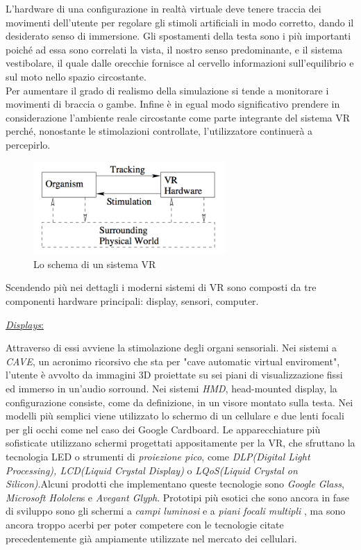 \newpage

L'hardware di una configurazione in realtà virtuale deve tenere traccia dei movimenti dell'utente per regolare gli stimoli artificiali in modo corretto, dando il desiderato senso di immersione.
Gli spostamenti della testa sono i più importanti poiché ad essa sono correlati la vista, il nostro senso predominante, e il sistema vestibolare, il quale dalle orecchie fornisce al cervello informazioni sull'equilibrio e sul moto nello spazio circostante.\cite{vestibular} \\
Per aumentare il grado di realismo della simulazione si tende a monitorare i movimenti di braccia o gambe. Infine è in egual modo significativo prendere in considerazione l'ambiente reale circostante come parte integrante del sistema VR perché, nonostante  le stimolazioni controllate, l'utilizzatore  continuerà a percepirlo.
\begin{figure}[H]
	\includegraphics[width=0.65\textwidth]{figure/TrackingStimuliBB}
	\centering
	\caption{Lo schema di un sistema VR}
\end{figure}

\newpage

Scendendo più nei dettagli i moderni sistemi di VR sono composti da tre componenti hardware principali: display, sensori, computer.
\begin{flushleft}
	\underline{\textit{Displays}:}
\end{flushleft}  Attraverso di essi avviene la stimolazione degli organi sensoriali. Nei sistemi a \textit{CAVE}, un acronimo ricorsivo che sta per "cave automatic virtual enviroment", l'utente è avvolto da immagini 3D proiettate su sei piani di visualizzazione fissi ed immerso in un'audio sorround. Nei sistemi \textit{HMD}, head-mounted display, la configurazione consiste, come da definizione, in un visore montato sulla testa. Nei modelli più semplici viene utilizzato lo schermo di un cellulare e due lenti focali per gli occhi come nel caso dei Google Cardboard. Le apparecchiature più sofisticate utilizzano schermi progettati appositamente per la VR, che sfruttano la tecnologia LED 
o strumenti di \textit{proiezione pico}, come \textit{DLP(Digital Light Processing), LCD(Liquid Crystal Display)} o \textit{LQoS(Liquid Crystal on Silicon)}.Alcuni prodotti che implementano queste tecnologie sono \textit{ Google Glass}, \textit{Microsoft Hololen}s e \textit{Avegant Glyph}. Prototipi più esotici che sono ancora in fase di sviluppo sono gli schermi a \textit{campi luminosi} \cite{LFD} e a \textit{piani focali multipli} \cite{MFP}, ma sono ancora troppo acerbi per poter competere con le tecnologie citate precedentemente già ampiamente utilizzate nel mercato dei cellulari. 

